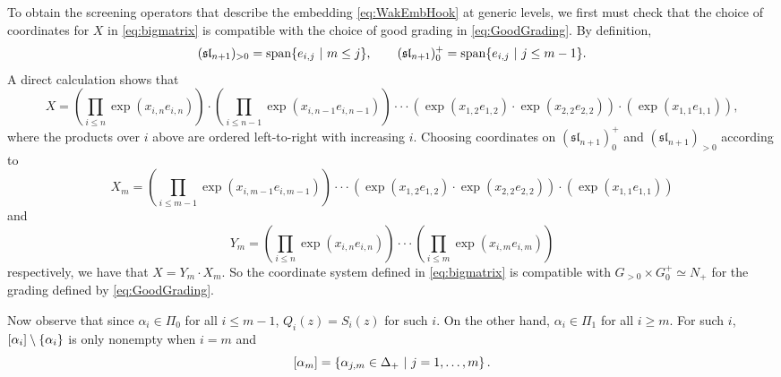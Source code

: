 \documentclass[10pt,a4paper]{amsart}
\numberwithin{equation}{section}
\renewcommand{\cong}{\simeq} %
\DeclarePairedDelimiter{\sqbrac}{\lbrack}{\rbrack} %
\DeclarePairedDelimiter{\set}{\lbrace}{\rbrace}
\newcommand{\alg}[1]{\mathfrak{#1}}  %
\newcommand{\SLA}[2]{\alg{#1}_{#2}}                      %
\newcommand{\slnpone}{\SLA{sl}{n+1}}
\newcommand{\proots}{\Delta_+}                                       %
\newcommand{\sroots}{\Pi}                                            %
\newcommand{\sroot}[1]{\alpha_{#1}}                                  %
\newcommand{\prvec}[1]{e_{#1}}                                        %
\theoremstyle{plain}
\begin{document}
To obtain the screening operators that describe the embedding \eqref{eq:WakEmbHook} at generic levels, we first must check that the choice of coordinates for $X$ in \eqref{eq:bigmatrix} is compatible with the choice of good grading in \eqref{eq:GoodGrading}. By definition,
%
\begin{equation}
    (\slnpone)_{>0} = \text{span} \set{\prvec{i,j} \ \vert \ m \leq j}, \qquad (\slnpone)^+_0 = \text{span} \set{\prvec{i,j} \ \vert \ j \leq m-1}.
\end{equation}
%
A direct calculation shows that
%
\begin{equation}
    X = \left(\prod_{i \leq n} \exp(x_{i,n} e_{i,n}) \right)\cdot \left(\prod_{i \leq n-1} \exp(x_{i,n-1} e_{i,n-1}) \right) \cdot \cdot \cdot \left(\exp(x_{1,2} e_{1,2}) \cdot \exp(x_{2,2} e_{2,2}) \right) \cdot \left(\exp(x_{1,1} e_{1,1})\right),
\end{equation}
%
where the products over $i$ above are ordered left-to-right with increasing $i$. Choosing coordinates on $(\slnpone)^+_0$ and $(\slnpone)_{>0}$ according to
%
\begin{equation}
    X_m = \left(\prod_{i \leq m-1} \exp(x_{i,m-1} e_{i,m-1}) \right) \cdot \cdot \cdot \left(\exp(x_{1,2} e_{1,2}) \cdot \exp(x_{2,2} e_{2,2}) \right) \cdot \left(\exp(x_{1,1} e_{1,1})\right)
\end{equation}
%
and
%
\begin{equation}
    Y_m = \left(\prod_{i \leq n} \exp(x_{i,n} e_{i,n}) \right)  \cdot \cdot \cdot \left(\prod_{i \leq m} \exp(x_{i,m} e_{i,m}) \right)
\end{equation}
%
respectively, we have that $X = Y_m \cdot X_m$. So the coordinate system defined in \eqref{eq:bigmatrix} is compatible with $G_{>0} \times G^+_0 \cong N_+$ for the grading defined by \eqref{eq:GoodGrading}.

Now observe that since $\sroot{i} \in \sroots_0$ for all $i \leq m-1$, $Q_i(z) = S_i(z)$ for such $i$. On the other hand, $\sroot{i} \in \sroots_1$ for all $i \geq m$. For such $i$, $\sqbrac{\sroot{i}} \setminus \set{\sroot{i}}$ is only nonempty when $i=m$ and
%
\begin{equation}
     \sqbrac{\sroot{m}} = \left\{ \alpha_{j,m} \in \proots \ \vert \ j=1, \dots, m \right\}.
\end{equation}
\end{document}
